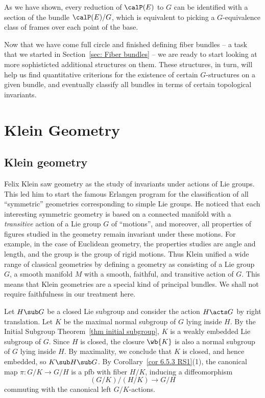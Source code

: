 As we have shown, every reduction of $\calP(E)$ to $G$ can be identified with a section of the bundle $\calP(E)\slash G$, which is equivalent to picking a $G$-equivalence class of frames over each point of the base.


Now that we have come full circle and finished defining fiber bundles -- a task that we started in Section~\ref{sec: Fiber bundles} -- we are ready to start looking at more sophisticted additional structures on them. These structures, in turn, will help us find quantitative criterions for the existence of certain $G$-structures on a given bundle, and eventually classify all bundles in terms of certain topological invariants.











\newpage
\section{Klein Geometry}

\subsection{Klein geometry}

Felix Klein saw geometry as the study of invariants under actions of Lie groups. This led him to start the famous Erlangen program for the classification of all ``symmetric'' geometries corresponding to simple Lie groups. He noticed that each interesting symmetric geometry is based on a connected manifold with a \emph{transitive} action of a Lie group $G$ of ``motions'', and moreover, all properties of figures studied in the geometry remain invariant under these motions. For example, in the case of Euclidean geometry, the properties studies are angle and length, and the group is the group of rigid motions. Thus Klein unified a wide range of classical geometries by defining a geometry as consisting of a Lie group $G$, a smooth manifold $M$ with a smooth, faithful, and transitive action of $G$. This means that Klein geometries are a special kind of principal bundles. We shall not require faithfulness in our treatment here.

Let $H\sub G$ be a closed Lie subgroup and consider the action $H\acts G$ by right translation. Let $K$ be the maximal normal subgroup of $G$ lying inside $H$. By the Initial Subgroup Theorem~\ref{thm initial subgroup}, $K$ is a weakly embedded Lie subgroup of $G$. Since $H$ is closed, the closure $\wb{K}$ is also a normal subgroup of $G$ lying inside $H$. By maximality, we conclude that $K$ is closed, and hence embedded, so $K\sub H\sub G$. By Corollary~\ref{cor 6.5.3 RS1}(1), the canonical map $\pi:G\slash K\to G\slash H$ is a \gls{pfb} with fiber $H\slash K$, inducing a diffeomorphism
\[(G\slash K)\slash (H\slash K)\to G\slash H\]
commuting with the canonical left $G\slash K$-actions.

